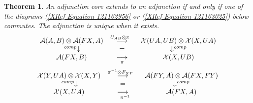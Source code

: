 \documentclass{amsart}
\newtheorem{theorem}{Theorem}[section]
\theoremstyle{definition}
\theoremstyle{remark}
\numberwithin{equation}{section}
\begin{document}
\begin{theorem}

An adjunction core extends to an adjunction if and only if one of
the diagrams (\ref{XRef-Equation-121162956} or (\ref{XRef-Equation-121163025})
below commutes. The adjunction is unique when it exists.
\begin{gather}
\begin{array}{ccc}
 \mathcal{A}( A,B) \otimes \mathcal{A}( F X,A)  & \overset{U_{A
B}\otimes \pi \ \ }{\longrightarrow } & \mathcal{X}( U A,U B) \otimes
\mathcal{X}( X,U A)  \\
 \left. {}{}^{\mathit{comp}}\right\downarrow   & = & \downarrow
^{\mathit{comp}} \\
 \mathcal{A}( F X,B)  & \operatorname*{\longrightarrow }\limits_{\ \ \pi
\ \ } & \mathcal{X}( X,U B) 
\end{array}%
\label{XRef-Equation-121162956}
\end{gather}
\begin{equation}
\begin{array}{ccc}
 \mathcal{X}( Y,U A) \otimes \mathcal{X}( X,Y)  & \overset{\pi ^{-1}\otimes
F_{X Y}\ \ }{\longrightarrow } & \mathcal{A}( F Y,A) \otimes \mathcal{A}(
F X,F Y)  \\
 \left. {}{}^{\mathit{comp}}\right\downarrow   & = & \downarrow
^{\mathit{comp}} \\
 \mathcal{X}( X,U A)  & \operatorname*{\longrightarrow }\limits_{\ \ \pi
^{-1}} & \mathcal{A}( F X,A) 
\end{array}%
\label{XRef-Equation-121163025}
\end{equation}
\end{theorem}
\end{document}
